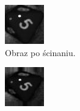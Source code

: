 \begin{figure}[H]
    \vspace{0.5cm} %

    \begin{subfigure}[t]{0.32\linewidth}
        \centering
        \includegraphics[width=\linewidth]{chapters/04-czytanie/figures/5_shear.jpg}
        \caption{Obraz po ścinaniu.}
        \label{fig:5shear}
    \end{subfigure}
    \hfill
    \begin{subfigure}[t]{0.32\linewidth}
        \centering
        \includegraphics[width=\linewidth]{chapters/04-czytanie/figures/5_zoom.jpg}

\end{subfigure}
\end{figure}
